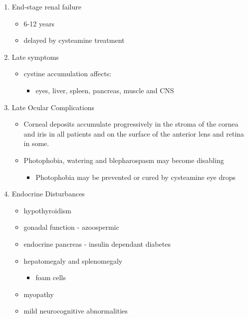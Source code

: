 \documentclass{scrartcl}
\begin{document}
\begin{enumerate}
\item End-stage renal failure
\label{sec:org7bd44be}
\begin{itemize}
\item 6-12 years
\item delayed by cysteamine treatment
\end{itemize}
\item Late symptoms
\label{sec:org916d644}
\begin{itemize}
\item cystine accumulation affects:
\begin{itemize}
\item eyes, liver, spleen, pancreas, muscle and CNS
\end{itemize}
\end{itemize}
\item Late Ocular Complications
\label{sec:orgbc7de72}
\begin{itemize}
\item Corneal deposits accumulate progressively in the stroma of the
cornea and iris in all patients and on the surface of the anterior
lens and retina in some.
\item Photophobia, watering and blepharospasm may become disabling
\begin{itemize}
\item Photophobia may be prevented or cured by cysteamine eye drops
\end{itemize}
\end{itemize}

\item Endocrine Disturbances
\label{sec:org5fda919}

\begin{itemize}
\item hypothyroidism
\item gonadal function - azoospermic
\item endocrine pancreas - insulin dependant diabetes
\item hepatomegaly and splenomegaly
\begin{itemize}
\item foam cells
\end{itemize}
\item myopathy
\item mild neurocognitive abnormalities
\end{itemize}



\end{enumerate}
\end{document}
